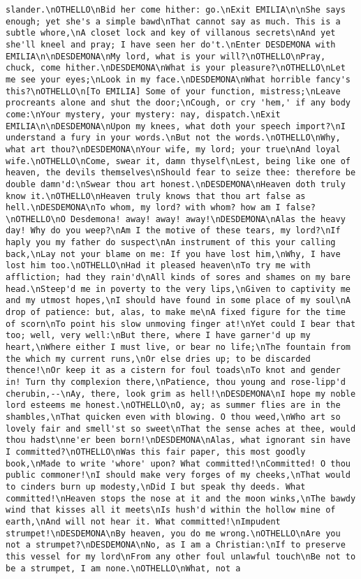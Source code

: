 \begin{verbatim}
slander.\nOTHELLO\nBid her come hither: go.\nExit EMILIA\n\nShe says enough; yet she's a simple bawd\nThat cannot say as much. This is a subtle whore,\nA closet lock and key of villanous secrets\nAnd yet she'll kneel and pray; I have seen her do't.\nEnter DESDEMONA with EMILIA\n\nDESDEMONA\nMy lord, what is your will?\nOTHELLO\nPray, chuck, come hither.\nDESDEMONA\nWhat is your pleasure?\nOTHELLO\nLet me see your eyes;\nLook in my face.\nDESDEMONA\nWhat horrible fancy's this?\nOTHELLO\n[To EMILIA] Some of your function, mistress;\nLeave procreants alone and shut the door;\nCough, or cry 'hem,' if any body come:\nYour mystery, your mystery: nay, dispatch.\nExit EMILIA\n\nDESDEMONA\nUpon my knees, what doth your speech import?\nI understand a fury in your words.\nBut not the words.\nOTHELLO\nWhy, what art thou?\nDESDEMONA\nYour wife, my lord; your true\nAnd loyal wife.\nOTHELLO\nCome, swear it, damn thyself\nLest, being like one of heaven, the devils themselves\nShould fear to seize thee: therefore be double damn'd:\nSwear thou art honest.\nDESDEMONA\nHeaven doth truly know it.\nOTHELLO\nHeaven truly knows that thou art false as hell.\nDESDEMONA\nTo whom, my lord? with whom? how am I false?\nOTHELLO\nO Desdemona! away! away! away!\nDESDEMONA\nAlas the heavy day! Why do you weep?\nAm I the motive of these tears, my lord?\nIf haply you my father do suspect\nAn instrument of this your calling back,\nLay not your blame on me: If you have lost him,\nWhy, I have lost him too.\nOTHELLO\nHad it pleased heaven\nTo try me with affliction; had they rain'd\nAll kinds of sores and shames on my bare head.\nSteep'd me in poverty to the very lips,\nGiven to captivity me and my utmost hopes,\nI should have found in some place of my soul\nA drop of patience: but, alas, to make me\nA fixed figure for the time of scorn\nTo point his slow unmoving finger at!\nYet could I bear that too; well, very well:\nBut there, where I have garner'd up my heart,\nWhere either I must live, or bear no life;\nThe fountain from the which my current runs,\nOr else dries up; to be discarded thence!\nOr keep it as a cistern for foul toads\nTo knot and gender in! Turn thy complexion there,\nPatience, thou young and rose-lipp'd cherubin,--\nAy, there, look grim as hell!\nDESDEMONA\nI hope my noble lord esteems me honest.\nOTHELLO\nO, ay; as summer flies are in the shambles,\nThat quicken even with blowing. O thou weed,\nWho art so lovely fair and smell'st so sweet\nThat the sense aches at thee, would thou hadst\nne'er been born!\nDESDEMONA\nAlas, what ignorant sin have I committed?\nOTHELLO\nWas this fair paper, this most goodly book,\nMade to write 'whore' upon? What committed!\nCommitted! O thou public commoner!\nI should make very forges of my cheeks,\nThat would to cinders burn up modesty,\nDid I but speak thy deeds. What committed!\nHeaven stops the nose at it and the moon winks,\nThe bawdy wind that kisses all it meets\nIs hush'd within the hollow mine of earth,\nAnd will not hear it. What committed!\nImpudent strumpet!\nDESDEMONA\nBy heaven, you do me wrong.\nOTHELLO\nAre you not a strumpet?\nDESDEMONA\nNo, as I am a Christian:\nIf to preserve this vessel for my lord\nFrom any other foul unlawful touch\nBe not to be a strumpet, I am none.\nOTHELLO\nWhat, not a 
\end{verbatim}
